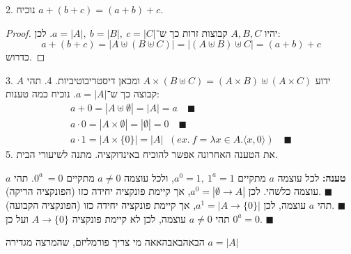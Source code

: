 \documentclass[]{article}
\newcommand\ra    {\rangle}
\newcommand\la    {\langle}
\newcommand\bs    {\blacksquare}
\begin{document}
	2. נוכיח $ a + (b + c) = (a + b) + c $. 
	\begin{proof}
		יהיו $ A, B, C $ קבוצות זרות כך ש־$ a = |A|, \ b = |B|, \ c = |C| $. לכן: 
		\[ a + (b + c) = |A \uplus (B \uplus C)| = |(A \uplus B) \uplus C| = (a + b) + c \]
		כדרוש. 
	\end{proof}
	3. ידוע $ A \times (B \uplus C) = (A \times B) \uplus (A \times C) $ ומכאן דיסטריבוטיביות. 
	4. תהי $ A $ קבוצה כך ש־$ a = |A| $. נוכיח כמה טענות: 
	\begin{gather}
		a + 0 = |A \uplus \emptyset| = |A| = a \quad \bs \\
		a \cdot 0 = |A \times \emptyset| = |\emptyset| = 0 \quad \bs \\
		a \cdot 1 = |A \times \{0\}| = |A| \; \; (ex. \ f = \lambda x \in A. \la x, 0 \ra) \quad \bs
	\end{gather}
	5. את הטענה האחרונה אפשר להוכיח באינדוקציה. מתנה לשיעורי הבית. 
	
	\textbf{טענה: }לכל עוצמה $ a $ מתקיים $ a^0 = 1, \ 1^a = 1 $, ולכל עוצמה $ a \neq 0 $ מתקיים $ 0^a\ = 0 $. 
	תהי $ a $ עוצמה כלשהי. לכן $ a^0 = |\emptyset \to A| $, אך קיימת פונקציה יחידה כזו (הפונקציה הריקה). \hfill $ \bs $ \\
	תהי $ a $ עוצמה, לכן $ a^1 = |A \to \{0\}| $, אך קיימת פונקציה יחידה כזו (הפונקציה הקבועה). \hfill $ \bs $ \\
	תהי $ a \neq 0 $ עוצמה, לכן לא קיימת פונקציה $ A \to \{0\} $ ועל כן $ 0^a = 0 $. \hfill $\bs$
	
	
	
	
	הבאהבאבהאאה מי צריך פורמליזם, שהמרצה מגדירה $ a = |A| $
	
	
\end{document}
